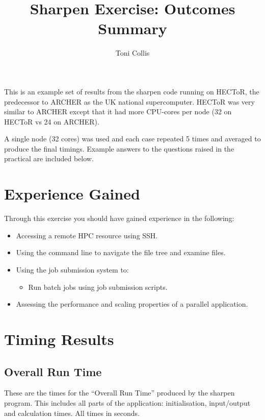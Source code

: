 \documentclass{article}
\title{Sharpen Exercise: Outcomes Summary}
\author{Toni Collis}
\date{}
\begin{document}
\makeEPCCtitle

This is an example set of results from the sharpen code running on
HECToR, the predecessor to ARCHER as the UK national
supercomputer. HECToR was very similar to ARCHER except that it had
more CPU-cores per node (32 on HECToR vs 24 on ARCHER).

A single node (32 cores) was used and each case repeated 5 times and
averaged to produce the final timings. Example answers to the
questions raised in the practical are included below.

\section{Experience Gained}
\label{sec-1}

Through this exercise you should have gained experience in the following:

\begin{itemize}
\item Accessing a remote HPC resource using SSH.
\item Using the command line to navigate the file tree and examine files.
\item Using the job submission system to:
\begin{itemize}
\item Run batch jobs using job submission scripts.
\end{itemize}
\item Assessing the performance and scaling properties of a parallel application.
\end{itemize}
\section{Timing Results}
\label{sec-2}


\subsection{Overall Run Time}
\label{sec-2.1}


These are the times for the ``Overall Run Time'' produced by the sharpen
program. This includes all parts of the application: initialisation,
input/output and calculation times. All times in seconds.
\end{document}
